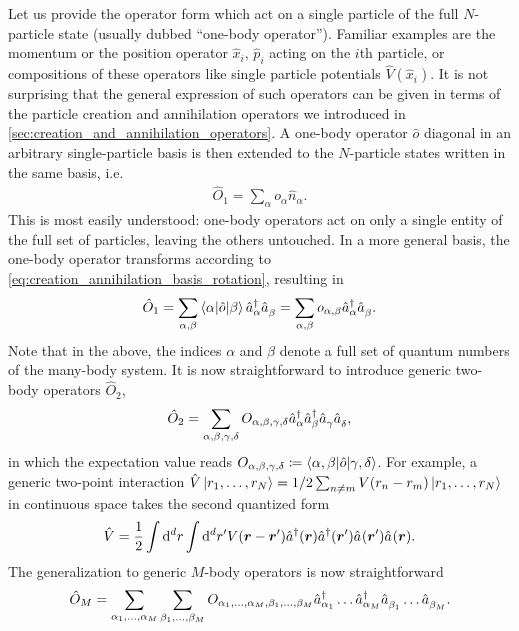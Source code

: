 Let us provide the operator form which act on a single particle of the full $N$-particle state (usually dubbed ``one-body operator'').
Familiar examples are the momentum or the position operator $\hat x_i$, $\hat p_i$ acting on the $i$th particle, or compositions of these operators like single particle potentials $\hat V(\hat x_i)$.
It is not surprising that the general expression of such operators can be given in terms of the particle creation and annihilation operators we introduced in \cref{sec:creation_and_annihilation_operators}.
A one-body operator $\hat o$ diagonal in an arbitrary single-particle basis is then extended to the $N$-particle states written in the same basis, i.e.
\begin{align}
    \hat O_1
    = \sum_{\alpha} o_{\alpha}\hat n_{\alpha}.
\end{align}
This is most easily understood: one-body operators act on only a single entity of the full set of particles, leaving the others untouched.
In a more general basis, the one-body operator transforms according to \cref{eq:creation_annihilation_basis_rotation}, resulting in
\begin{align}
    \hat O_1 = \sum_{\alpha, \beta}\braket{\alpha | \hat o | \beta} \hat a^\dag_\alpha \hat a^\pdag_\beta = \sum_{\alpha,\beta}o_{\alpha,\beta}\hat a^\dag_\alpha \hat a^\pdag_\beta.
    \label{eq:one_body_operator}
\end{align}
Note that in the above, the indices $\alpha$ and $\beta$ denote a full set of quantum numbers of the many-body system.
It is now straightforward to introduce generic two-body operators $\hat O_2$,
\begin{align}
    \hat O_2 = \sum_{\alpha,\beta,\gamma,\delta}O_{\alpha,\beta,\gamma,\delta}\hat a^\dag_\alpha \hat a^\dag_\beta \hat a^\pdag_\gamma \hat a^\pdag_\delta,
\end{align}
in which the expectation value reads $O_{\alpha,\beta,\gamma,\delta}\coloneqq \braket{\alpha,\beta | \hat o | \gamma,\delta}$.
For example, a generic two-point interaction $\hat V\ket{r_1,\dots,r_N}=1/2\sum_{n\neq m}V(r_n-r_m)\ket{r_1,\dots,r_N}$ in continuous space takes the second quantized form
\begin{align}
    \hat V = \frac12\int{\rd^d r}\int{\rd^d r'}V({\bm r}-{\bm r'})\hat a^\dag({\bm r})\hat a^\dag({\bm r'})\hat a^\pdag({\bm r'})\hat a^\pdag({\bm r}).
    \label{eq:two_point_interaction}
\end{align}
The generalization to generic $M$-body operators is now straightforward
\begin{align}
    \hat O_M = \sum_{\alpha_1,\dots,\alpha_M}\sum_{\beta_1,\dots,\beta_M}O_{\alpha_1,\dots,\alpha_M,\beta_1,\dots,\beta_M}\hat a^\dag_{\alpha_1}\dots \hat a^\dag_{\alpha_M}\hat a^\pdag_{\beta_1}\dots \hat a^\pdag_{\beta_M}.
\end{align}
%
%

